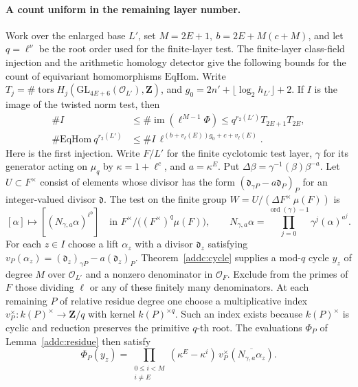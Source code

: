 \paragraph{A count uniform in the remaining layer number.}
Work over the enlarged base \(L'\), set \(M=2E+1,\ b=2E+M(c+M)\), and let \(q=\ell^\nu\) be the root order used for the finite-layer test. The finite-layer class-field injection and the arithmetic homology detector give the following bounds for the count of equivariant homomorphisms \(\mathrm{EqHom}\). Write \(T_j=\#\operatorname{tors}H_j(\mathrm{GL}_{4E+6}(\mathcal O_{L'}),\mathbf Z)\), and \(g_0=2n'+\lfloor\log_2 h_{L'}\rfloor+2\). If \(I\) is the image of the twisted norm test, then
\begin{equation}\label{sup:lengthcount}
\begin{aligned}
 \#I&\le\#\operatorname{im}(\ell^{M-1}\Phi)\le q^{r_2(L')}T_{2E+1}T_{2E},\\
 \#\mathrm{EqHom}\ q^{r_2(L')}
 &\le \#I\,\ell^{(b+v_\ell(E))g_0+c+v_\ell(E)} .
\end{aligned}
\end{equation}
Here is the first injection. Write \(F/L'\) for the finite cyclotomic test layer,
\(\gamma\) for its generator acting on \(\mu_q\) by \(\kappa=1+\ell^c\),
and \(a=\kappa^E\). Put \(\Delta\beta=\gamma^{-1}(\beta)\beta^{-a}\).
Let \(U\subset F^\times\) consist of elements whose divisor has the form
\((\mathfrak d_{\gamma P}-a\mathfrak d_P)_P\) for an integer-valued
divisor \(\mathfrak d\). The test on the finite group
\(W=U/(\Delta F^\times\,\mu(F))\) is
\[
 [\alpha]\longmapsto [(N_{\gamma,a}\alpha)^{\ell^b}]
 \quad\text{in }F^\times/\big((F^\times)^q\mu(F)\big),\qquad
 N_{\gamma,a}\alpha=\prod_{j=0}^{\operatorname{ord}(\gamma)-1}
                       \gamma^j(\alpha)^{a^j}.
\]
For each \(z\in I\) choose a lift \(\alpha_z\) with a divisor
\(\mathfrak d_z\) satisfying
\(v_P(\alpha_z)=(\mathfrak d_z)_{\gamma P}-a(\mathfrak d_z)_P\).
Theorem~\ref{addc:cycle} supplies a mod-\(q\) cycle \(y_z\)
of degree \(M\) over \(\mathcal O_{L'}\) and a nonzero denominator in
\(\mathcal O_F\). Exclude from the primes of \(F\) those dividing
\(\ell\) or any of these finitely many denominators. At each remaining
\(P\) of relative residue degree one choose a multiplicative index
\(v_P^\times:k(P)^\times\to\mathbf Z/q\) with kernel \(k(P)^{\times q}\).
Such an index exists because \(k(P)^\times\) is cyclic and reduction
preserves the primitive \(q\)-th root. The evaluations
\(\Phi_P\) of Lemma~\ref{addc:residue} then satisfy
\[
 \Phi_P(y_z)=
 \prod_{\substack{0\le i<M\\ i\ne E}}(\kappa^E-\kappa^i)\,
 v_P^\times\!\left(\overline{N_{\gamma,a}\alpha_z}\right).
\]
